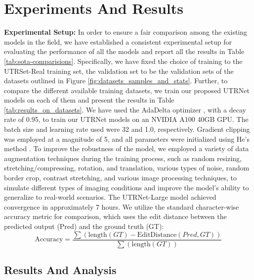\documentclass[runningheads]{llncs}
\newcommand{\ModelName}{{UTRNet}\xspace}
\newcommand{\DatasetNameReal}{{UTRSet-Real}\xspace}
\newcommand{\mypara}[1]{\vspace{0.5em} \noindent \textbf{#1:}}
\begin{document}
\section{Experiments And Results}
\label{section:experiments}



\mypara{Experimental Setup}
In order to ensure a fair comparison among the existing models in the field, we have established a consistent experimental setup for evaluating the performance of all the models and report all the results in Table \ref{tab:sota-comparisions}. Specifically, we have fixed the choice of training to the \DatasetNameReal training set, the validation set to be the validation sets of the datasets outlined in Figure \ref{fig:datasets_samples_and_stats}. Further, to compare the different available training datasets, we train our proposed \ModelName models on each of them and present the results in Table \ref{tab:results_on_datasets}. We have used the AdaDelta optimizer \cite{adadelta_orig}, with a decay rate of 0.95, to train our \ModelName models on an NVIDIA A100 40GB GPU. The batch size and learning rate used were 32 and 1.0, respectively. Gradient clipping was employed at a magnitude of 5, and all parameters were initialized using He's method \cite{hrnet_orig}. To improve the robustness of the model, we employed a variety of data augmentation techniques during the training process, such as random resizing, stretching/compressing, rotation, and translation, various types of noise, random border crop, contrast stretching, and various image processing techniques, to simulate different types of imaging conditions and improve the model's ability to generalize to real-world scenarios. The \ModelName-Large model achieved convergence in approximately 7 hours. We utilize the standard character-wise accuracy metric for comparison, which uses the edit distance between the predicted output (Pred) and the ground truth (GT):
\[
\text{Accuracy} = \frac{\sum \left( \text{length}(GT) - \text{EditDistance}(Pred,GT) \right) }{\sum \left( \text{length}(GT) \right)}
\]

\subsection{Results And Analysis}
\end{document}
